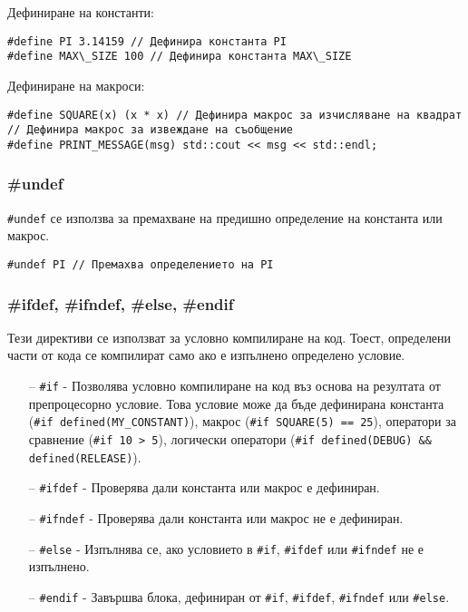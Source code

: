 \documentclass[oneside]{book}
\newcommand*{\code}[1]{\texttt{#1}}
\begin{document}
Дефиниране на константи:
\begin{mdframed}\begin{lstlisting}
#define PI 3.14159 // Дефинира константа PI
#define MAX\_SIZE 100 // Дефинира константа MAX\_SIZE
\end{lstlisting}\end{mdframed}

Дефиниране на макроси:
\begin{mdframed}\begin{lstlisting}
#define SQUARE(x) (x * x) // Дефинира макрос за изчисляване на квадрат
// Дефинира макрос за извеждане на съобщение
#define PRINT_MESSAGE(msg) std::cout << msg << std::endl;
\end{lstlisting}\end{mdframed}

\subsubsection{\#undef}
\code{\#undef} се използва за премахване на предишно определение на константа или макрос.

\begin{mdframed}\begin{lstlisting}
#undef PI // Премахва определението на PI
\end{lstlisting}\end{mdframed}

\subsubsection{\#ifdef, \#ifndef, \#else, \#endif}
Тези директиви се използват за условно компилиране на код. Тоест, определени части от кода се компилират само ако е изпълнено определено условие.

\begin{itemize}
    \item[--] \code{\#if} - Позволява условно компилиране на код въз основа на резултата от препроцесорно условие.
    Това условие може да бъде дефинирана константа (\code{\#if defined(MY\_CONSTANT)}), макрос (\code{\#if SQUARE(5) == 25}),
    оператори за сравнение (\code{\#if 10 > 5}), логически оператори (\code{\#if defined(DEBUG) \&\& defined(RELEASE)}).
    \item[--] \code{\#ifdef} - Проверява дали константа или макрос е дефиниран.
    \item[--] \code{\#ifndef} - Проверява дали константа или макрос не е дефиниран.
    \item[--] \code{\#else} - Изпълнява се, ако условието в \code{\#if}, \code{\#ifdef} или \code{\#ifndef} не е изпълнено.
    \item[--] \code{\#endif} - Завършва блока, дефиниран от \code{\#if}, \code{\#ifdef}, \code{\#ifndef} или \code{\#else}.
\end{itemize}
\end{document}
